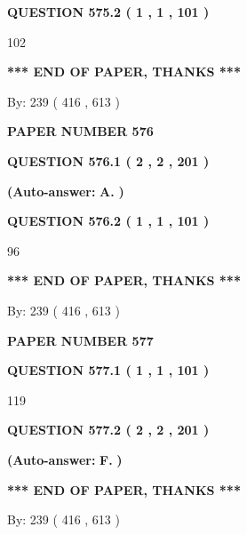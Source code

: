 \documentclass[12pt]{article}
\begin{document}
  
{\textbf{\large{QUESTION
575.2 
 ( 1 , 1 , 101 )
}}}

102
   
   
   
   
\vspace{1.0in} 
{\textbf{\large{ *** END OF PAPER, THANKS *** }}} 
   
   
\hspace{1.0in} By: 
 239 ( 416 ,  613 )
   
   
   
   
\newpage 
\setcounter{page}{ 
   576001 } 
   
   
 {\textbf{ \Large{ PAPER NUMBER  576  }}}
   
   
   
   
  
  
{\textbf{\large{QUESTION
576.1 
 ( 2 , 2 , 201 )
}}}
 
 
{\textbf{(Auto-answer:}}
{\textbf{\large{
A.}}}
{\textbf{)}}
 
 
  
  
{\textbf{\large{QUESTION
576.2 
 ( 1 , 1 , 101 )
}}}

96
   
   
   
   
\vspace{1.0in} 
{\textbf{\large{ *** END OF PAPER, THANKS *** }}} 
   
   
\hspace{1.0in} By: 
 239 ( 416 ,  613 )
   
   
   
   
\newpage 
\setcounter{page}{ 
   577001 } 
   
   
 {\textbf{ \Large{ PAPER NUMBER  577  }}}
   
   
   
   
  
  
{\textbf{\large{QUESTION
577.1 
 ( 1 , 1 , 101 )
}}}

119
  
  
{\textbf{\large{QUESTION
577.2 
 ( 2 , 2 , 201 )
}}}
 
 
{\textbf{(Auto-answer:}}
{\textbf{\large{
F.}}}
{\textbf{)}}
 
 
   
   
   
   
\vspace{1.0in} 
{\textbf{\large{ *** END OF PAPER, THANKS *** }}} 
   
   
\hspace{1.0in} By: 
 239 ( 416 ,  613 )
   
   
   
\end{document}
